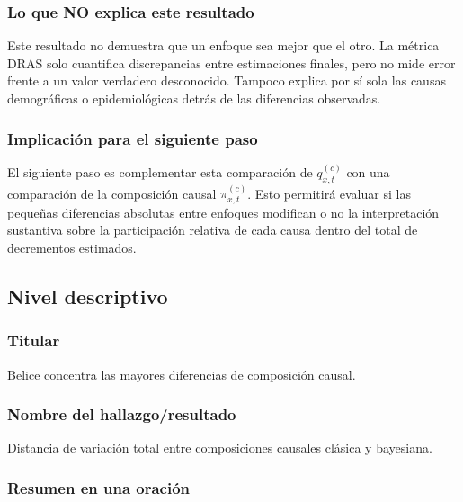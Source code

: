 \documentclass[
  spanish,
  letterpaper,
  DIV=11,
  numbers=noendperiod]{scrartcl}
\begin{document}
\subsubsection{Lo que NO explica este
resultado}\label{lo-que-no-explica-este-resultado}

Este resultado no demuestra que un enfoque sea mejor que el otro. La
métrica DRAS solo cuantifica discrepancias entre estimaciones finales,
pero no mide error frente a un valor verdadero desconocido. Tampoco
explica por sí sola las causas demográficas o epidemiológicas detrás de
las diferencias observadas.

\subsubsection{Implicación para el siguiente
paso}\label{implicaciuxf3n-para-el-siguiente-paso}

El siguiente paso es complementar esta comparación de \(q_{x,t}^{(c)}\)
con una comparación de la composición causal \(\pi_{x,t}^{(c)}\). Esto
permitirá evaluar si las pequeñas diferencias absolutas entre enfoques
modifican o no la interpretación sustantiva sobre la participación
relativa de cada causa dentro del total de decrementos estimados.

\subsection{Nivel descriptivo}\label{nivel-descriptivo-2}

\subsubsection{Titular}\label{titular-1}

Belice concentra las mayores diferencias de composición causal.

\subsubsection{Nombre del
hallazgo/resultado}\label{nombre-del-hallazgoresultado-1}

Distancia de variación total entre composiciones causales clásica y
bayesiana.

\subsubsection{Resumen en una
oración}\label{resumen-en-una-oraciuxf3n-1}
\end{document}
